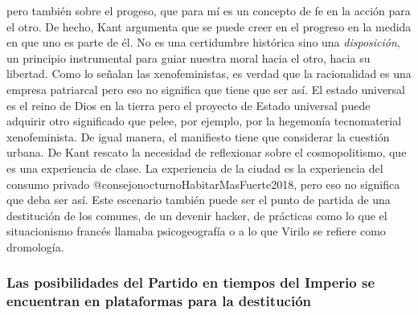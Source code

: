 \documentclass[
]{article}
\begin{document}
pero también sobre el progeso, que para mí es un concepto de fe en la
acción para el otro. De hecho, Kant argumenta que se puede creer en el
progreso en la medida en que uno es parte de él. No es una certidumbre
histórica sino una \emph{disposición}, un principio instrumental para
guiar nuestra moral hacia el otro, hacia su libertad. Como lo señalan
las xenofeministas, es verdad que la racionalidad es una empresa
patriarcal pero eso no significa que tiene que ser así. El estado
universal es el reino de Dios en la tierra pero el proyecto de Estado
universal puede adquirir otro significado que pelee, por ejemplo, por la
hegemonía tecnomaterial xenofeminista. De igual manera, el manifiesto
tiene que considerar la cuestión urbana. De Kant rescato la necesidad de
reflexionar sobre el cosmopolitismo, que es una experiencia de clase. La
experiencia de la ciudad es la experiencia del consumo privado
@consejonocturnoHabitarMasFuerte2018, pero eso no significa que deba ser
así. Este escenario también puede ser el punto de partida de una
destitución de los comunes, de un devenir hacker, de prácticas como lo
que el situacionismo francés llamaba psicogeografía o a lo que Virilo se
refiere como dromología.

\hypertarget{las-posibilidades-del-partido-en-tiempos-del-imperio-se-encuentran-en-plataformas-para-la-destituciuxf3n}{%
\subsubsection{Las posibilidades del Partido en tiempos del Imperio se
encuentran en plataformas para la
destitución}\label{las-posibilidades-del-partido-en-tiempos-del-imperio-se-encuentran-en-plataformas-para-la-destituciuxf3n}}
\end{document}
